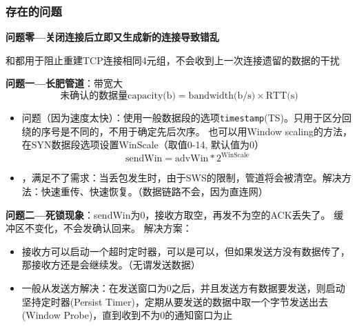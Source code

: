 \subsubsection{存在的问题}
\textbf{问题零---关闭连接后立即又生成新的连接导致错乱}

\bigskip
{}和都用于阻止重建TCP连接相同4元组，不会收到上一次连接遗留的数据的干扰

\myhline
\textbf{问题一---长肥管道}：带宽大
\[\text{未确认的数据量capacity(b)} = \text{bandwidth(b/s)} \times \text{RTT(s)}\]
\begin{itemize}
\item {}问题（因为速度太快）：使用一般数据段的选项\verb'timestamp'(TS)。只用于区分回绕的序号是不同的，不用于确定先后次序。
也可以用Window scaling的方法，在SYN数据段选项设置WinScale（取值0-14, 默认值为0）
\[\text{sendWin} = \text{advWin} * 2^{\text{WinScale}}\]
\item {}，满足不了需求：当丢包发生时，由于SWS的限制，管道将会被清空。解决方法：快速重传、快速恢复。（数据链路不会，因为直连网）
\end{itemize}

\myhline
\textbf{问题二---死锁现象}：sendWin为0，接收方取空，再发不为空的ACK丢失了。
缓冲区不变化，不会发确认回来。
解决方案：
\begin{itemize}
\item 接收方可以启动一个超时定时器，可以是可以，但如果发送方没有数据传了，那接收方还是会继续发。（无谓发送数据）
\item 一般从发送方解决：在发送窗口为0之后，并且发送方有数据要发送，则启动坚持定时器(Persist Timer)，定期从要发送的数据中取一个字节发送出去(Window Probe)，直到收到不为0的通知窗口为止
\end{itemize}


